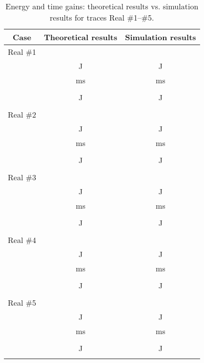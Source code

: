 \documentclass[journal,10pt,twoside,final]{IEEEtran}
\begin{document}
\begin{table}[h]
\caption{Energy and time gains: theoretical results vs. simulation results for traces Real \#1--\#5.}
\label{tab:results2}
\centering
\begin{tabular}{|c|c|c|}
\hline 
Case & Theoretical results & Simulation results\\
\hline 
\hline  
Real \#1          &      & \\
  &  J     &  J\\ \cline{2-3}
                  &  ms   &  ms\\         
                  &     &  \\
                  &  J    &  J\\ \cline{2-3}
                  &  & \\                       
\hline
\hline
Real \#2          &      & \\
  &  J     &  J \\  \cline{2-3}
                  &  ms   &  ms\\         
                  &     &  \\
                  &  J    &  J\\  \cline{2-3}
                  &  & \\                       
\hline
\hline
Real \#3          &      & \\
  &  J     &  J \\ \cline{2-3}
                  &  ms   &  ms\\         
                  &     &  \\
                  &  J    &  J\\  \cline{2-3}
                  &  & \\                       
\hline
\hline
Real \#4          &      & \\
  &  J     &  J \\  \cline{2-3} 
                  &  ms   &  ms\\        
                  &     &  \\
                  &  J    &  J\\   \cline{2-3}
                  &  & \\                       
\hline
\hline
Real \#5          &      & \\
  &  J     &  J \\  \cline{2-3}
                  &  ms   &  ms\\         
                  &     &  \\
                  &  J    &  J\\  \cline{2-3}
                  &  & \\                       
\hline              
\end{tabular}
\end{table}
\end{document}
